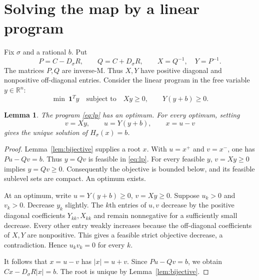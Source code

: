 \documentclass[11pt,a4paper]{article}
\newtheorem{lemma}[theorem]{Lemma}
\theoremstyle{remark}\newtheorem{remark}[theorem]{Remark}
\newcommand{\R}{\mathbb R}
\newcommand{\one}{\mathbf 1}
\begin{document}
\section{Solving the map by a linear program}
Fix $\sigma$ and a rational $b$. Put
\[
 P=C-D_\sigma R,\qquad Q=C+D_\sigma R,
 \qquad X=Q^{-1},\quad Y=P^{-1}.
\]
The matrices $P,Q$ are inverse-M. Thus $X,Y$ have positive diagonal and nonpositive off-diagonal entries. Consider the linear program in the free variable $y\in\R^n$:
\begin{equation}\label{eq:lp}
 \min\ \one^Ty
 \quad\text{subject to}\quad Xy\ge0,\qquad Y(y+b)\ge0.
\end{equation}
\begin{lemma}\label{lem:lp}
The program \eqref{eq:lp} has an optimum. For every optimum, setting
\[
 v=Xy,\qquad u=Y(y+b),\qquad x=u-v
\]
gives the unique solution of $H_\sigma(x)=b$.
\end{lemma}
\begin{proof}
Lemma~\ref{lem:bijective} supplies a root $x$. With $u=x^+$ and $v=x^-$, one has $Pu-Qv=b$. Thus $y=Qv$ is feasible in \eqref{eq:lp}. For every feasible $y$, $v=Xy\ge0$ implies $y=Qv\ge0$. Consequently the objective is bounded below, and its feasible sublevel sets are compact. An optimum exists.

At an optimum, write $u=Y(y+b)\ge0$, $v=Xy\ge0$. Suppose $u_k>0$ and $v_k>0$. Decrease $y_k$ slightly. The $k$th entries of $u,v$ decrease by the positive diagonal coefficients $Y_{kk},X_{kk}$ and remain nonnegative for a sufficiently small decrease. Every other entry weakly increases because the off-diagonal coefficients of $X,Y$ are nonpositive. This gives a feasible strict objective decrease, a contradiction. Hence $u_kv_k=0$ for every $k$.

It follows that $x=u-v$ has $|x|=u+v$. Since $Pu-Qv=b$, we obtain $Cx-D_\sigma R|x|=b$. The root is unique by Lemma~\ref{lem:bijective}.
\end{proof}
\end{document}
